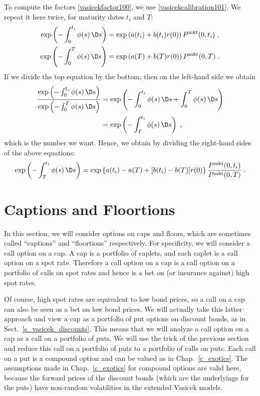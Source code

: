 To compute the factors \eqref{vasicekfactor100},
we use  \eqref{vasicekcalibration101}.  We repeat it here twice, for maturity dates $t_i$ and $T$:
\begin{align*}
\exp\left(-\int_0^{t_i} \phi(s)\,\D s\right) &= \exp\left(a(t_i)+b(t_i)r(0)\right)P^{\text{mkt}}(0,t_i)\; ,\\
\exp\left(-\int_0^{T} \phi(s)\,\D s\right) &= \exp\left(a(T)+b(T)r(0)\right)P^{\text{mkt}}(0,T)\;.
\end{align*}
If we divide the top equation by the bottom, then on the left-hand side we obtain
\begin{align*}
\frac{\exp\left(-\int_0^{t_i} \phi(s)\,\D s\right)}{\exp\left(-\int_0^{T} \phi(s)\,\D s\right)} &= \exp\left(-\int_0^{t_i} \phi(s)\,\D s + \int_0^{T} \phi(s)\,\D s\right) \\
&= \exp\left(-\int_T^{t_i} \phi(s)\,\D s\right)\; ,
\end{align*}
which is the number we want.  Hence, we obtain by dividing the right-hand sides of the above equations:
\begin{equation}\label{swaptions104}
\exp\left(-\int_T^{t_i} \phi(s)\,\D s\right) = \exp\left\{a(t_i)-a(T) + [b(t_i)-b(T)]r(0)\right\}\frac{P^{\text{mkt}}(0,t_i)}{P^{\text{mkt}}(0,T)}\;.
\end{equation}



\section{Captions and Floortions}\label{s_captions}

In this section, we will consider options on caps and floors, which are sometimes called ``captions'' and ``floortions''  respectively.  For specificity, we will consider a call option on a cap.
A cap is a portfolio of caplets, and each caplet is a call option on a spot rate.  Therefore a call option on a cap is a call option on a portfolio of calls on spot rates and hence is a bet on (or insurance against) high spot rates.  

Of course, high spot rates are equivalent to low bond prices, so a call on a cap can also be seen as a bet on low bond prices.  We will actually take this latter approach and view a cap as a portfolio of put options on discount bonds, as in Sect.~\ref{s_vasicek_discounts}.  This means that we will analyze a call option on a cap as a call on a portfolio of puts.  We will use the trick of the previous section and reduce this call on a portfolio of puts to a portfolio of calls on puts.  Each call on a put is a compound option and can be valued as in Chap.~\ref{c_exotics}.  The assumptions made in Chap.~\ref{c_exotics} for compound options are valid here, because the forward prices of the discount bonds (which are the underlyings for the puts) have non-random volatilities in the extended Vasicek models.

